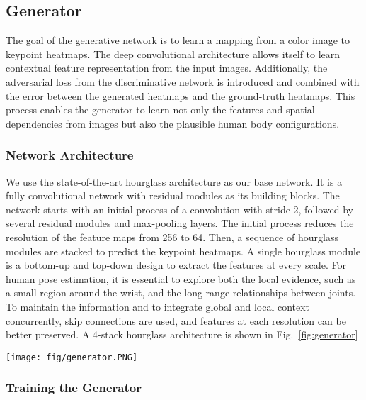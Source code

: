 \documentclass[10pt,twocolumn,letterpaper]{article}
\begin{document}
\subsection{Generator}
The goal of the generative network is to learn a mapping from a color image to keypoint heatmaps. The deep convolutional architecture allows itself to learn contextual feature representation from the input images. Additionally, the adversarial loss from the discriminative network is introduced and combined with the error between the generated heatmaps and the ground-truth heatmaps. This process enables the generator to learn not only the features and spatial dependencies from images but also the plausible human body configurations.

\subsubsection{Network Architecture}
We use the state-of-the-art hourglass architecture \cite{NewellYD16} as our base network. It is a fully convolutional network with residual modules as its building blocks. The network starts with an initial process of a  convolution with stride 2, followed by several residual modules and max-pooling layers. The initial process reduces the resolution of the feature maps from 256 to 64. Then, a sequence of hourglass modules are stacked to predict the keypoint heatmaps. A single hourglass module is a bottom-up and top-down design to extract the features at every scale. For human pose estimation, it is essential to explore both the local evidence, such as a small region around the wrist, and the long-range relationships between joints. To maintain the information and to integrate global and local context concurrently, skip connections are used, and features at each resolution can be better preserved. A 4-stack hourglass architecture is shown in Fig.~\ref{fig:generator}

\begin{figure*}[t]
	\centering
	\texttt{[image: fig/generator.PNG]}
    \caption{The architecture of 4-stack hourglass. The hourglass module consists of residual blocks (zoomed-in at bottom-left), pooling layers, upsampling layers, and skip connections. Between each pair of consecutive hourglass stacks, there is a transition block (yellow box) which produces intermediate heatmaps and adds them to the main trunk of the network.}
    \label{fig:generator}
\end{figure*}

\subsubsection{Training the Generator} \label{subsec:first_training}
\end{document}

